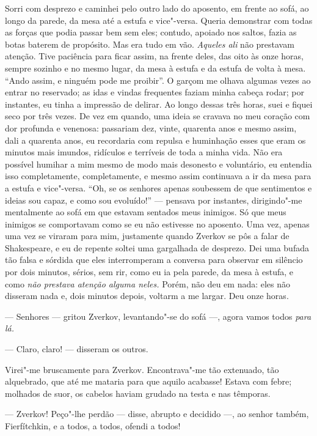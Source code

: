 Sorri com desprezo e caminhei pelo outro lado do aposento, em frente ao
sofá, ao longo da parede, da mesa até a estufa e vice"-versa. Queria
demonstrar com todas as forças que podia passar bem sem eles; contudo,
apoiado nos saltos, fazia as botas baterem de propósito. Mas era tudo em
vão. \emph{Aqueles ali} não prestavam atenção. Tive paciência para ficar
assim, na frente deles, das oito às onze horas, sempre sozinho e no
mesmo lugar, da mesa à estufa e da estufa de volta à mesa. ``Ando assim,
e ninguém pode me proibir''. O garçom me olhava algumas vezes ao entrar
no reservado; as idas e vindas frequentes faziam minha cabeça rodar; por
instantes, eu tinha a impressão de delirar. Ao longo dessas três horas,
suei e fiquei seco por três vezes. De vez em quando, uma ideia se
cravava no meu coração com dor profunda e venenosa: passariam dez,
vinte, quarenta anos e mesmo assim, dali a quarenta anos, eu recordaria
com repulsa e huminhação esses que eram os minutos mais imundos,
ridículos e terríveis de toda a minha vida. Não era possível humihar a
mim mesmo de modo mais desonesto e voluntário, eu entendia isso
completamente, completamente, e mesmo assim continuava a ir da mesa para
a estufa e vice"-versa. ``Oh, se os senhores apenas soubessem de que
sentimentos e ideias sou capaz, e como sou evoluído!'' --- pensava por
instantes, dirigindo"-me mentalmente ao sofá em que estavam sentados meus
inimigos. Só que meus inimigos se comportavam como se eu não estivesse
no aposento. Uma vez, apenas uma vez se viraram para mim, justamente
quando Zverkov se pôs a falar de Shakespeare, e eu de repente soltei uma
gargalhada de desprezo. Dei uma bufada tão falsa e sórdida que eles
interromperam a conversa para observar em silêncio por dois minutos,
sérios, sem rir, como eu ia pela parede, da mesa à estufa, e como
\emph{não prestava atenção alguma neles.} Porém, não deu em nada: eles
não disseram nada e, dois minutos depois, voltarm a me largar. Deu onze
horas.

--- Senhores --- gritou Zverkov, levantando"-se do sofá ---, agora vamos todos
\emph{para lá.}

--- Claro, claro! --- disseram os outros.

Virei"-me bruscamente para Zverkov. Encontrava"-me tão extenuado, tão
alquebrado, que até me mataria para que aquilo acabasse! Estava com
febre; molhados de suor, os cabelos haviam grudado na testa e nas
têmporas.

--- Zverkov! Peço"-lhe perdão --- disse, abrupto e decidido ---, ao senhor
também, Fierfítchkin, e a todos, a todos, ofendi a todos!

